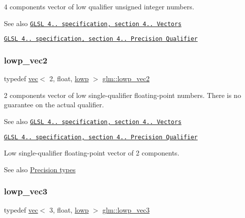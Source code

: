 4 components vector of low qualifier unsigned integer numbers.

\begin{DoxySeeAlso}{See also}
\href{http://www.opengl.org/registry/doc/GLSLangSpec.4.20.8.pdf}{\tt G\+L\+SL 4.. specification, section 4.. Vectors} 

\href{http://www.opengl.org/registry/doc/GLSLangSpec.4.20.8.pdf}{\tt G\+L\+SL 4.. specification, section 4.. Precision Qualifier} 
\end{DoxySeeAlso}
\mbox{\label{group__core__precision_gaade87cebca8e38717e38c18df8fc9c8a}} 
\subsubsection{\texorpdfstring{lowp\+\_\+vec2}{lowp\_vec2}}
{\footnotesize\ttfamily typedef \hyperlink{structglm_1_1vec}{vec}$<$ 2, float, \hyperlink{namespaceglm_a36ed105b07c7746804d7fdc7cc90ff25ae161af3fc695e696ce3bf69f7332bc2d}{lowp} $>$ \hyperlink{group__core__precision_gaade87cebca8e38717e38c18df8fc9c8a}{glm\+::lowp\+\_\+vec2}}

2 components vector of low single-\/qualifier floating-\/point numbers. There is no guarantee on the actual qualifier.

\begin{DoxySeeAlso}{See also}
\href{http://www.opengl.org/registry/doc/GLSLangSpec.4.20.8.pdf}{\tt G\+L\+SL 4.. specification, section 4.. Vectors} 

\href{http://www.opengl.org/registry/doc/GLSLangSpec.4.20.8.pdf}{\tt G\+L\+SL 4.. specification, section 4.. Precision Qualifier}
\end{DoxySeeAlso}
Low single-\/qualifier floating-\/point vector of 2 components. \begin{DoxySeeAlso}{See also}
\hyperlink{group__core__precision}{Precision types} 
\end{DoxySeeAlso}
\mbox{\label{group__core__precision_ga185f659de082bad5abfa576891d0612d}} 
\subsubsection{\texorpdfstring{lowp\+\_\+vec3}{lowp\_vec3}}
{\footnotesize\ttfamily typedef \hyperlink{structglm_1_1vec}{vec}$<$ 3, float, \hyperlink{namespaceglm_a36ed105b07c7746804d7fdc7cc90ff25ae161af3fc695e696ce3bf69f7332bc2d}{lowp} $>$ \hyperlink{group__core__precision_ga185f659de082bad5abfa576891d0612d}{glm\+::lowp\+\_\+vec3}}

